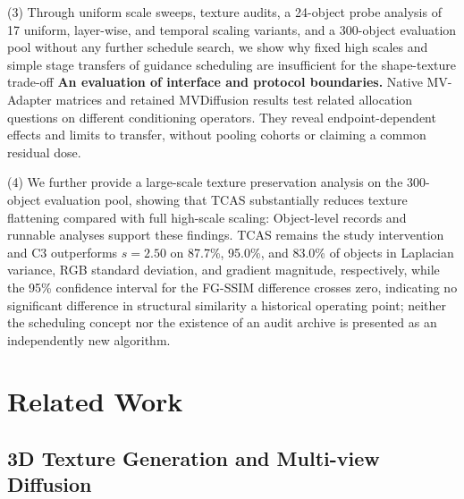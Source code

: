 \documentclass[times,twocolumn,final]{elsarticle}
\providecommand{\DIFadd}[1]{{\protect\color{blue} \sf #1}} %
\providecommand{\DIFdel}[1]{{\protect\color{red} \scriptsize #1}} %
\providecommand{\DIFaddbegin}{} %
\providecommand{\DIFaddend}{} %
\providecommand{\DIFdelbegin}{} %
\providecommand{\DIFdelend}{} %
\begin{document}
(3) \DIFdelbegin \DIFdel{Through uniform scale sweeps, texture audits, a 24-object probe analysis of 17 uniform, layer-wise, and temporal scaling variants, and a 300-object evaluation pool without any further schedule search, we show why fixed high scales and simple stage transfers of guidance scheduling are insufficient for the shape-texture trade-off}\DIFdelend \DIFaddbegin \DIFadd{\textbf{An evaluation of interface and protocol boundaries.} Native MV-Adapter matrices and retained MVDiffusion results test related allocation questions on different conditioning operators. They reveal endpoint-dependent effects and limits to transfer, without pooling cohorts or claiming a common residual dose}\DIFaddend .

\DIFdelbegin \DIFdel{(4) We further provide a large-scale texture preservation analysis on the 300-object evaluation pool, showing that TCAS substantially reduces texture flattening compared with full high-scale scaling: }\DIFdelend \DIFaddbegin \DIFadd{Object-level records and runnable analyses support these findings. TCAS remains the study intervention and }\DIFaddend C3 \DIFdelbegin \DIFdel{outperforms $s = 2.50$ on 87.7\%, 95.0\%, and 83.0\% of objects in Laplacian variance, RGB standard deviation, and gradient magnitude, respectively, while the 95\% confidence interval for the FG-SSIM difference crosses zero, indicating no significant difference in structural similarity}\DIFdelend \DIFaddbegin \DIFadd{a historical operating point; neither the scheduling concept nor the existence of an audit archive is presented as an independently new algorithm}\DIFaddend .

\section{Related Work}
\label{sec:related}

\subsection{3D Texture Generation and Multi-view Diffusion}
\label{subsec:3dtex}
\end{document}
